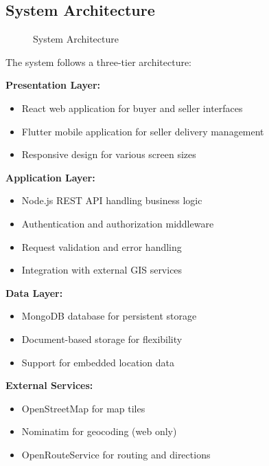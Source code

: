 \documentclass[12pt,a4paper]{article}
\begin{document}
\subsection{System Architecture}

\begin{figure}[h]
    \centering
    \caption{System Architecture}
\end{figure}

The system follows a three-tier architecture:

\textbf{Presentation Layer:}
\begin{itemize}
    \item React web application for buyer and seller interfaces
    \item Flutter mobile application for seller delivery management
    \item Responsive design for various screen sizes
\end{itemize}

\textbf{Application Layer:}
\begin{itemize}
    \item Node.js REST API handling business logic
    \item Authentication and authorization middleware
    \item Request validation and error handling
    \item Integration with external GIS services
\end{itemize}

\textbf{Data Layer:}
\begin{itemize}
    \item MongoDB database for persistent storage
    \item Document-based storage for flexibility
    \item Support for embedded location data
\end{itemize}

\textbf{External Services:}
\begin{itemize}
    \item OpenStreetMap for map tiles
    \item Nominatim for geocoding (web only)
    \item OpenRouteService for routing and directions
\end{itemize}
\end{document}
